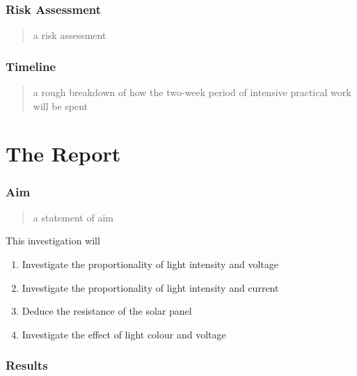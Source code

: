 \documentclass{article}
\begin{document}
\section{Risk Assessment}
\begin{quote}
a risk assessment
\end{quote}

\section{Timeline}
\begin{quote}
a rough breakdown of how the two-week period of intensive practical work will be spent
\end{quote}
\pagebreak [4]
\part{The Report}

\section{Aim}
\begin{quote}
  a statement of aim
\end{quote}
This investigation will
\begin{enumerate}
  \item Investigate the proportionality of light intensity and voltage
  \item Investigate the proportionality of light intensity and current
  \item Deduce the resistance of the solar panel
  \item Investigate the effect of light colour and voltage
\end{enumerate}

\section{Results}
\end{document}
